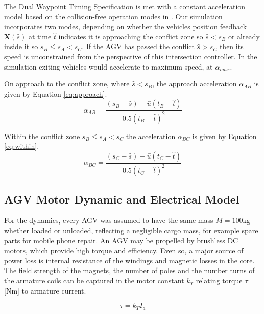 The Dual Waypoint Timing Specification is met with a constant acceleration model based on the collision-free operation modes in \cite{He2020}. 
Our simulation incorporates two modes, depending on whether the vehicles position feedback $\bm{X}(\hat{s})$ at time $\hat{t}$ indicates it is approaching the conflict zone so $\hat{s}<s_B$ or already inside it so $s_B\leq s_A<s_C$. If the AGV has passed the conflict $\hat{s}>s_C$ then its speed is unconstrained from the perspective of this intersection controller. In the simulation exiting vehicles would accelerate to maximum speed, at $\alpha_{max}$.

On approach to the conflict zone, where $\hat{s}<s_B$, the approach acceleration $\alpha_{AB}$ is given by Equation \ref{eq:approach}.
\begin{equation}
	\alpha_{AB} = \frac{(s_B - \hat{s}) - \hat{u}(t_B - \hat{t}) }{0.5 (t_B - \hat{t})^2}
	\label{eq:approach}
\end{equation}

Within the conflict zone $s_B \leq s_A<s_C$ the acceleration $\alpha_{BC}$ is given by Equation \ref{eq:within}.
\begin{equation}
	\alpha_{BC} = \frac{(s_C - \hat{s}) - \hat{u}(t_C - \hat{t}) }{0.5 (t_C - \hat{t})^2}
	\label{eq:within}
\end{equation}

\subsection{AGV Motor Dynamic and Electrical Model}
For the dynamics, every AGV was assumed to have the same mass $M=100$kg whether loaded or unloaded, reflecting a negligible cargo mass, for example spare parts for mobile phone repair. An AGV may be propelled by brushless DC motors, which provide high torque and efficiency. Even so, a major source of power loss is internal resistance of the windings and magnetic losses in the core.  %
The field strength of the magnets, the number of poles and the number turns of the armature coils can be captured in the motor constant $k_T $ relating torque $\tau$ [Nm] to armature current.

\begin{equation}
	\tau = k_T I_a
	\label{eq:torque_constant}
\end{equation} 

